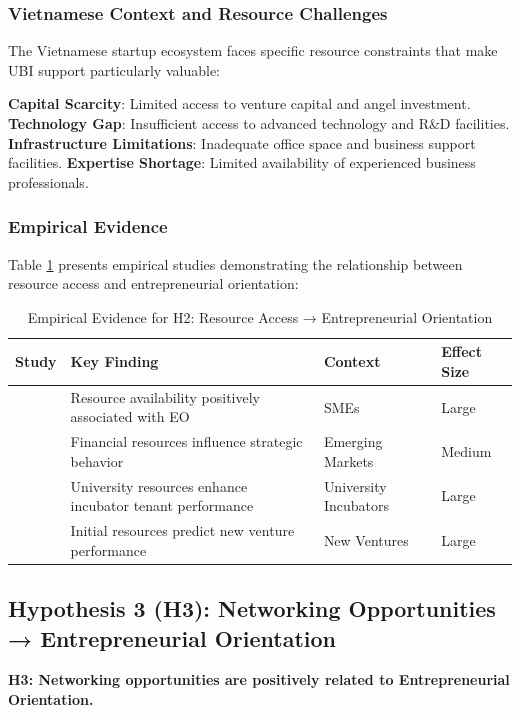 \documentclass[../Main.tex]{subfiles}
\begin{document}
    \subsubsection{Vietnamese Context and Resource Challenges}
    The Vietnamese startup ecosystem faces specific resource constraints that make UBI support particularly valuable:

    \textbf{Capital Scarcity}: Limited access to venture capital and angel investment. 
    \textbf{Technology Gap}: Insufficient access to advanced technology and R\&D facilities. 
    \textbf{Infrastructure Limitations}: Inadequate office space and business support facilities. 
    \textbf{Expertise Shortage}: Limited availability of experienced business professionals.

    \subsubsection{Empirical Evidence}
    Table \ref{tab:h2_evidence} presents empirical studies demonstrating the relationship between resource access and entrepreneurial orientation:

    \begin{table}[H]
        \centering
        \caption{Empirical Evidence for H2: Resource Access → Entrepreneurial Orientation}
        \label{tab:h2_evidence}
        \begin{tabular}{|p{3cm}|p{4cm}|p{3cm}|p{2cm}|}
            \hline
            \textbf{Study} & \textbf{Key Finding} & \textbf{Context} & \textbf{Effect Size} \\
            \hline
            \cite{wiklund2005entrepreneurial} & Resource availability positively associated with EO & SMEs & Large \\
            \hline
            \cite{bruton2010governance} & Financial resources influence strategic behavior & Emerging Markets & Medium \\
            \hline
            \cite{mian1996assessing} & University resources enhance incubator tenant performance & University Incubators & Large \\
            \hline
            \cite{cooper1994initial} & Initial resources predict new venture performance & New Ventures & Large \\
            \hline
        \end{tabular}
    \end{table}

    \subsection{Hypothesis 3 (H3): Networking Opportunities → Entrepreneurial Orientation}
    \textbf{H3: Networking opportunities are positively related to Entrepreneurial Orientation.}
\end{document}
